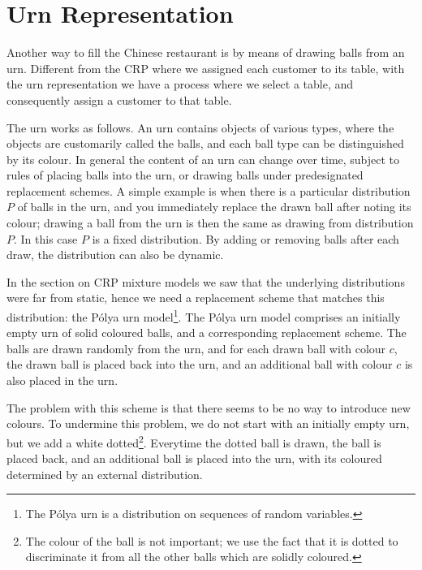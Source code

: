 \section{Urn Representation}
Another way to fill the Chinese restaurant is by means of drawing balls from an urn. Different from the CRP where we assigned each customer to its table, with the urn representation we have a process where we select a table, and consequently assign a customer to that table.

The urn works as follows. An urn contains objects of various types, where the objects are customarily called the balls, and each ball type can be distinguished by its colour. In general the content of an urn can change over time, subject to rules of placing balls into the urn, or drawing balls under predesignated replacement schemes. A simple example is when there is a particular distribution $P$ of balls in the urn, and you immediately replace the drawn ball after noting its colour; drawing a ball from the urn is then the same as drawing from distribution $P$. In this case $P$ is a fixed distribution. By adding or removing balls after each draw, the distribution can also be dynamic.

In the section on CRP mixture models we saw that the underlying distributions were far from static, hence we need a replacement scheme that matches this distribution: the P\'olya urn model\footnote{The P\'olya urn is a distribution on sequences of random variables.}. The P\'olya urn model comprises an initially empty urn of solid coloured balls, and a corresponding replacement scheme. The balls are drawn randomly from the urn, and for each drawn ball with colour $c$, the drawn ball is placed back into the urn, and an additional ball with colour $c$ is also placed in the urn. 

The problem with this scheme is that there seems to be no way to introduce new colours. To undermine this problem, we do not start with an initially empty urn, but we add a white dotted\footnote{The colour of the ball is not important; we use the fact that it is dotted to discriminate it from all the other balls which are solidly coloured.}. Everytime the dotted ball is drawn, the ball is placed back, and an additional ball is placed into the urn, with its coloured determined by an external distribution.

